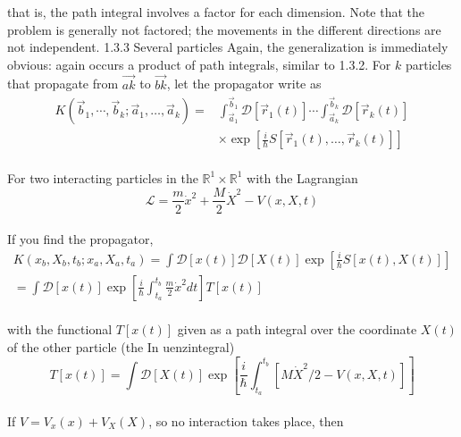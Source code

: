 that is, the path integral involves a factor for each dimension. Note
that the problem is generally not factored; the movements in the
different directions are not independent.
1.3.3 Several particles
Again, the generalization is immediately obvious: again occurs
a product of path integrals, similar to 1.3.2. For $k$ particles that
propagate from $\vec{ak}$ to $\vec{bk}$, let the propagator write as
\\
\begin{equation}
\begin{aligned} K\left(\vec{b}_{1}, \cdots, \vec{b}_{k} ; \vec{a}_{1}, \ldots, \vec{a}_{k}\right)=& \int_{\vec{a}_{1}}^{\vec{b}_{1}} \mathcal{D}\left[\vec{r}_{1}(t)\right] \cdots \int_{\vec{a}_{k}}^{\vec{b}_{k}} \mathcal{D}\left[\vec{r}_{k}(t)\right] \\ & \times \exp \left[\frac{i}{\hbar} S\left[\vec{r}_{1}(t), \ldots, \vec{r}_{k}(t)\right]\right] \end{aligned}
\end{equation}\\
For two interacting particles in the $\mathbb{R}^1\times \mathbb{R}^1$ with the Lagrangian
\\
\begin{equation}
\mathcal{L}=\frac{m}{2} \dot{x}^{2}+\frac{M}{2} \dot{X}^{2}-V(x, X, t)
\end{equation}\\
If you find the propagator,
\\
\begin{equation}
\begin{array}{c}{K\left(x_{b}, X_{b}, t_{b} ; x_{a}, X_{a}, t_{a}\right)=\int \mathcal{D}[x(t)] \mathcal{D}[X(t)] \exp \left[\frac{i}{\hbar} S[x(t), X(t)]\right]} \\ {=\int \mathcal{D}[x(t)] \exp \left[\frac{i}{\hbar} \int_{t_{a}}^{t_{b}} \frac{m}{2} \dot{x}^{2} d t\right] T[x(t)]}\end{array}
\end{equation}\\
with the functional $T [x (t)]$ given as a path integral over the coordinate
$X (t)$ of the other particle (the In
uenzintegral)
\\
\begin{equation}
T[x(t)]=\int \mathcal{D}[X(t)] \exp \left[\frac{i}{\hbar} \int_{t_{a}}^{t_{b}}\left[M \dot{X}^{2} / 2-V(x, X, t)\right]\right]
\end{equation}\\
If $V = V_x (x) + V_X(X)$, so no interaction takes place, then

